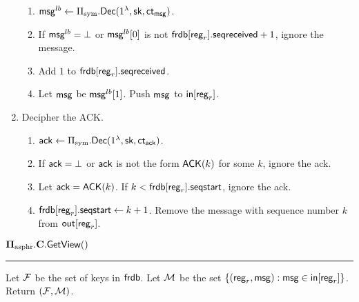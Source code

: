 \begin{definition}
\begin{enumerate}
\begin{enumerate}
        \item $\mathsf{msg}^{lb} \leftarrow \Pi_{\text{sym}}.\mathsf{Dec}(1^{\lambda}, {\mathsf{sk}}, \mathsf{ct}_{\mathsf{msg}})$.
        \item If $\mathsf{msg}^{lb} = \bot$ or $\mathsf{msg}^{lb}[0]$ is not $\mathsf{frdb}[\mathsf{reg}_r].\mathsf{seqreceived} + 1$, ignore the message.
        \item Add $1$ to $\mathsf{frdb}[\mathsf{reg}_r].\mathsf{seqreceived}$. 
        \item Let $\mathsf{msg}$ be $\mathsf{msg}^{lb}[1]$. Push $\mathsf{msg}$ to $\mathsf{in}[\mathsf{reg}_r]$.
    \end{enumerate}
    \item Decipher the ACK.
    \begin{enumerate}
        \item $\mathsf{ack} \leftarrow \Pi_{\text{sym}}.\mathsf{Dec}(1^{\lambda}, {\mathsf{sk}}, \mathsf{ct}_{\mathsf{ack}})$.
        \item If $\mathsf{ack} = \bot$ or $\mathsf{ack}$ is not the form $\mathsf{ACK}(k)$ for some $k$, ignore the ack.
        \item Let $\mathsf{ack} = \mathsf{ACK}(k)$. If $k < \mathsf{frdb}[\mathsf{reg}_r].\mathsf{seqstart}$, ignore the ack.
        \item $\mathsf{frdb}[\mathsf{reg}_r].\mathsf{seqstart} \leftarrow k + 1$. Remove the message with sequence number $k$ from $\mathsf{out}[\mathsf{reg}_r]$.
    \end{enumerate}
\end{enumerate}
\vspace{10pt}
$\mathbf{\Pi_{\text{asphr}}.C.\mathsf{GetView}}()$
\vspace{5pt}
\hrule
\vspace{5pt}
Let $\mathcal{F}$ be the set of keys in $\mathsf{frdb}$. Let $\mathcal{M}$ be the set $\{(\mathsf{reg}_r, \mathsf{msg}): \mathsf{msg} \in \mathsf{in}[\mathsf{reg}_r]\}$. Return $(\mathcal{F}, \mathcal{M})$.

\end{definition}